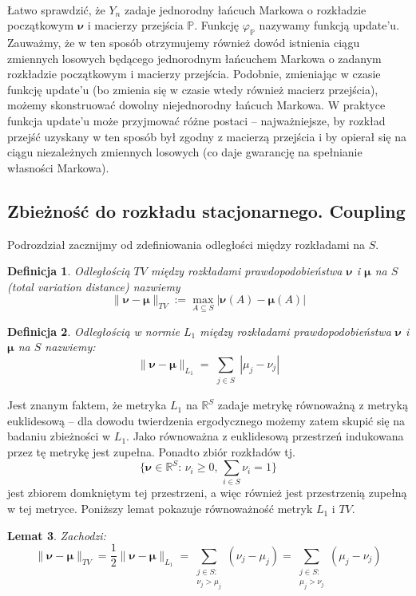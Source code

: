 \documentclass[a4paper]{article}
\theoremstyle{defn}
\newtheorem{defn}{Definicja}[subsection]
\theoremstyle{theorem}
\theoremstyle{lemma}
\newtheorem{lemma}[defn]{Lemat}
\theoremstyle{cor}
\theoremstyle{fact}
\begin{document}
\\
Łatwo sprawdzić, że $Y_n$ zadaje jednorodny łańcuch Markowa o rozkładzie początkowym $\boldsymbol{\nu}$ i macierzy przejścia $\mathbb{P}$. Funkcję $\varphi_{\mathbb{P}}$ nazywamy funkcją update'u. Zauważmy, że w ten sposób otrzymujemy również dowód istnienia ciągu zmiennych losowych będącego jednorodnym łańcuchem Markowa o zadanym rozkładzie początkowym i macierzy przejścia.
Podobnie, zmieniając w czasie funkcję update'u (bo zmienia się w czasie wtedy również macierz przejścia), możemy skonstruować dowolny niejednorodny łańcuch Markowa. W praktyce funkcja update'u może przyjmować różne postaci – najważniejsze, by rozkład przejść uzyskany w ten sposób był zgodny z macierzą przejścia i by opierał się na ciągu niezależnych zmiennych losowych (co daje gwarancję na spełnianie własności Markowa).
\subsection{Zbieżność do rozkładu stacjonarnego. Coupling}
\label{sect2.4}
Podrozdział zacznijmy od zdefiniowania odległości między rozkładami na $S$.
\begin{defn}\label{defn2.4.1}
Odległością $TV$ między rozkładami prawdopodobieństwa $\boldsymbol{\nu}$ i $\boldsymbol{\mu}$ na $S$ (\textit{total variation distance}) nazwiemy $$\|\boldsymbol{\nu} - \boldsymbol{\mu}\|_{TV} := \max\limits_{A \subseteq S} |\boldsymbol{\nu}(A) - \boldsymbol{\mu}(A)|$$
\end{defn}
\begin{defn}\label{defn2.4.2}
Odległością w normie $L_1$ między rozkładami prawdopodobieństwa $\boldsymbol{\nu}$ i $\boldsymbol{\mu}$ na $S$ nazwiemy:
$$\|\boldsymbol{\nu} - \boldsymbol{\mu}\|_{L_1} = \sum\limits_{\substack{j \in S}} |\mu_j - \nu_j|$$
\end{defn}
Jest znanym faktem, że metryka $L_1$ na $\mathbb{R}^S$ zadaje metrykę równoważną z metryką euklidesową – dla dowodu twierdzenia ergodycznego możemy zatem skupić się na badaniu zbieżności w $L_1$. Jako równoważna z euklidesową przestrzeń indukowana przez tę metrykę jest zupełna. Ponadto zbiór rozkładów tj. 
$$\{\boldsymbol{\nu} \in \mathbb{R}^S:\, \nu_i \geq 0, \, \sum\limits_{i \in S} \nu_i = 1\}$$ 
jest zbiorem domkniętym tej przestrzeni, a więc również jest przestrzenią zupełną w tej metryce. Poniższy lemat pokazuje równoważność metryk $L_1$ i $TV$.
\begin{lemma}\label{lemma2.4.3}
Zachodzi: 
$$\|\boldsymbol{\nu} - \boldsymbol{\mu}\|_{TV} = \frac{1}{2}\|\boldsymbol{\nu} - \boldsymbol{\mu}\|_{L_1} = \sum\limits_{\substack{j \in S:\\ \nu_j > \mu_j}} (\nu_j - \mu_j) = \sum\limits_{\substack{j \in S:\\ \mu_j > \nu_j}} (\mu_j - \nu_j)$$
\end{lemma}
\end{document}
